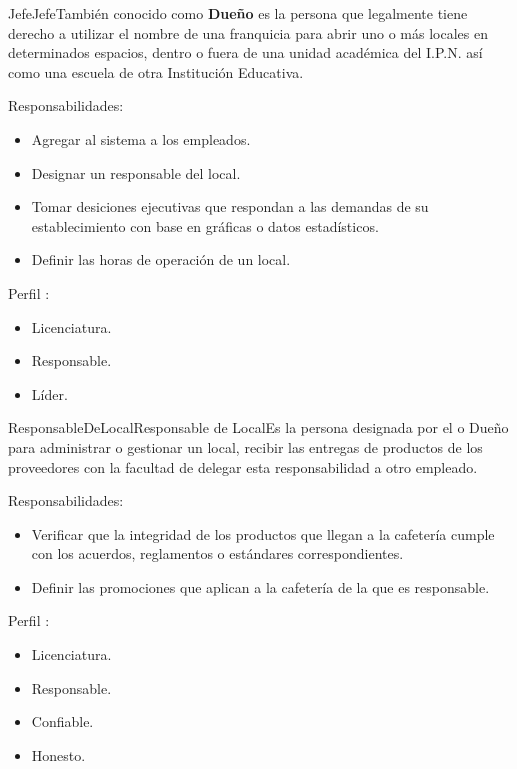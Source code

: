 \begin{Actor}{Jefe}{Jefe}{También conocido como \textbf{Dueño} es la persona que legalmente tiene derecho a utilizar el nombre de una franquicia para abrir uno o más locales en determinados espacios, dentro o fuera de una unidad académica del I.P.N. así como una escuela de otra Institución Educativa.}
	\item[Responsabilidades:] \hspace{1pt}
		\begin{itemize}
			\item Agregar al sistema a los empleados.
			\item Designar un responsable del local.
			\item Tomar desiciones ejecutivas que respondan a las demandas de su establecimiento con base en 			gráficas o datos estadísticos.
			\item Definir las horas de operación de un local.
		\end{itemize}
	\item[Perfil]:\hspace{1pt}
		\begin{itemize}
			\item Licenciatura.
			\item Responsable.
			\item Líder.
		\end{itemize}
\end{Actor}

\begin{Actor}{ResponsableDeLocal}{Responsable de Local}{Es la persona designada por el  o Dueño para administrar o gestionar un local, recibir las entregas de productos de los proveedores con la facultad de delegar esta responsabilidad a otro empleado. }
	\item[Responsabilidades:] \hspace{1pt}
		\begin{itemize}
			\item Verificar que la integridad de los productos que llegan a la cafetería cumple con los acuerdos, reglamentos o estándares correspondientes.
			\item Definir las promociones que aplican a la cafetería de la que es responsable.
		\end{itemize}
	\item[Perfil]:\hspace{1pt}
		\begin{itemize}
			\item Licenciatura.
			\item Responsable.
			\item Confiable.
			\item Honesto.	
		\end{itemize}
\end{Actor}


